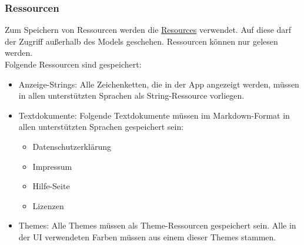 \subsubsection{Ressourcen}
Zum Speichern von Ressourcen werden die \href{https://developer.android.com/reference/android/content/res/Resources}
{Resources} verwendet. Auf diese darf der Zugriff außerhalb des Models geschehen. Ressourcen können nur gelesen werden.\\
Folgende Ressourcen sind gespeichert:
\begin{itemize}
    \item Anzeige-Strings: Alle Zeichenketten, die in der App angezeigt werden, 
    müssen in allen unterstützten Sprachen als String-Ressource vorliegen.\\
    \item Textdokumente: Folgende Textdokumente müssen im Markdown-Format in allen unterstützten 
    Sprachen gespeichert sein:\\
    \begin{itemize}
        \item Datenschutzerklärung
        \item Impressum
        \item Hilfe-Seite
        \item Lizenzen
    \end{itemize}
    \item Themes: Alle Themes müssen als Theme-Ressourcen gespeichert sein. 
    Alle in der UI verwendeten Farben müssen aus einem dieser Themes stammen.\\
\end{itemize}